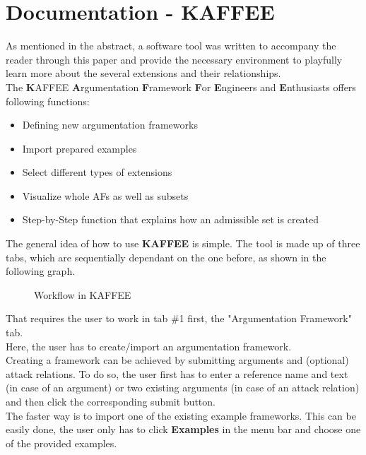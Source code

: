 \documentclass[12pt]{report}
\numberwithin{figure}{chapter}
\theoremstyle{break}
\begin{document}
\chapter{Documentation - KAFFEE}

As mentioned in the abstract, a software tool was written to accompany the reader through this paper and provide the necessary environment to playfully learn more about
the several extensions and their relationships.\\
The \textbf{K}AFFEE \textbf{A}rgumentation \textbf{F}ramework \textbf{F}or \textbf{E}ngineers and \textbf{E}nthusiasts offers following functions:
\begin{itemize}
	\item{Defining new argumentation frameworks}
	\item{Import prepared examples}
	\item{Select different types of extensions}
	\item{Visualize whole AFs as well as subsets}
	\item{Step-by-Step function that explains how an admissible set is created}
\end{itemize}

\bigskip
The general idea of how to use \textbf{KAFFEE} is simple. The tool is made up of three tabs, which are sequentially dependant on the one before, as shown in the following graph.
\bigskip

\begin{figure}[h!]
\begin{center}\end{center}
\caption{Workflow in KAFFEE}
\end{figure}

\bigskip
That requires the user to work in tab \#1 first, the "Argumentation Framework" tab.\\Here, the user has to create/import an argumentation framework.\\
Creating a framework can be achieved by submitting arguments and (optional) attack relations. To do so, the user first has to enter a reference name and text (in case of an argument)
or two existing arguments (in case of an attack relation) and then click the corresponding submit button.\\
The faster way is to import one of the existing example frameworks. This can be easily done, the user only has to click \textbf{Examples} in the menu bar and choose one of the provided
examples.
\end{document}
